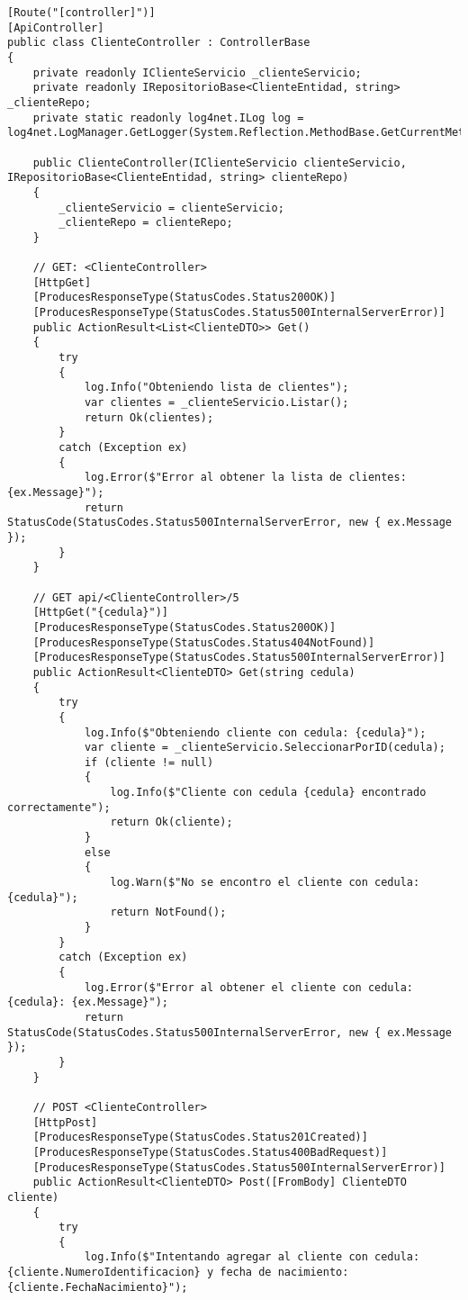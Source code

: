 \documentclass[executivepaper]{article}
\begin{document}
\begin{lstlisting}
[Route("[controller]")]
[ApiController]
public class ClienteController : ControllerBase
{
    private readonly IClienteServicio _clienteServicio;
    private readonly IRepositorioBase<ClienteEntidad, string> _clienteRepo;
    private static readonly log4net.ILog log = log4net.LogManager.GetLogger(System.Reflection.MethodBase.GetCurrentMethod().DeclaringType);

    public ClienteController(IClienteServicio clienteServicio, IRepositorioBase<ClienteEntidad, string> clienteRepo)
    {
        _clienteServicio = clienteServicio;
        _clienteRepo = clienteRepo;
    }

    // GET: <ClienteController>
    [HttpGet]
    [ProducesResponseType(StatusCodes.Status200OK)]
    [ProducesResponseType(StatusCodes.Status500InternalServerError)]
    public ActionResult<List<ClienteDTO>> Get()
    {
        try
        {
            log.Info("Obteniendo lista de clientes");
            var clientes = _clienteServicio.Listar();
            return Ok(clientes);
        }
        catch (Exception ex)
        {
            log.Error($"Error al obtener la lista de clientes: {ex.Message}");
            return StatusCode(StatusCodes.Status500InternalServerError, new { ex.Message });
        }
    }

    // GET api/<ClienteController>/5
    [HttpGet("{cedula}")]
    [ProducesResponseType(StatusCodes.Status200OK)]
    [ProducesResponseType(StatusCodes.Status404NotFound)]
    [ProducesResponseType(StatusCodes.Status500InternalServerError)]
    public ActionResult<ClienteDTO> Get(string cedula)
    {
        try
        {
            log.Info($"Obteniendo cliente con cedula: {cedula}");
            var cliente = _clienteServicio.SeleccionarPorID(cedula);
            if (cliente != null)
            {
                log.Info($"Cliente con cedula {cedula} encontrado correctamente");
                return Ok(cliente);
            }
            else
            {
                log.Warn($"No se encontro el cliente con cedula: {cedula}");
                return NotFound();
            }
        }
        catch (Exception ex)
        {
            log.Error($"Error al obtener el cliente con cedula: {cedula}: {ex.Message}");
            return StatusCode(StatusCodes.Status500InternalServerError, new { ex.Message });
        }
    }

    // POST <ClienteController>
    [HttpPost]
    [ProducesResponseType(StatusCodes.Status201Created)]
    [ProducesResponseType(StatusCodes.Status400BadRequest)]
    [ProducesResponseType(StatusCodes.Status500InternalServerError)]
    public ActionResult<ClienteDTO> Post([FromBody] ClienteDTO cliente)
    {
        try
        {
            log.Info($"Intentando agregar al cliente con cedula: {cliente.NumeroIdentificacion} y fecha de nacimiento: {cliente.FechaNacimiento}");


\end{lstlisting}
\end{document}
